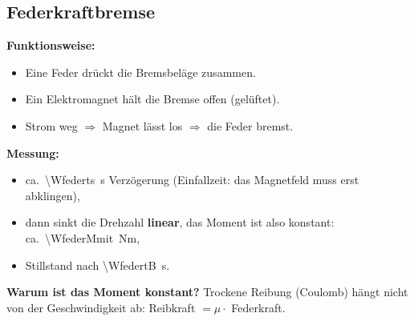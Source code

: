 \documentclass[11pt,a4paper]{article}
\begin{document}
\subsection{Federkraftbremse}
\textbf{Funktionsweise:}
\begin{itemize}
\item Eine Feder drückt die Bremsbeläge zusammen.
\item Ein Elektromagnet hält die Bremse offen (\glqq gelüftet\grqq).
\item Strom weg $\Rightarrow$ Magnet lässt los $\Rightarrow$ die Feder bremst.
\end{itemize}
\textbf{Messung:}
\begin{itemize}
\item ca.\ \SI{\Wfederts}{s} Verzögerung (Einfallzeit: das Magnetfeld muss erst abklingen),
\item dann sinkt die Drehzahl \textbf{linear}, das Moment ist also konstant: ca.\ \SI{\WfederMmit}{Nm},
\item Stillstand nach \SI{\WfedertB}{s}.
\end{itemize}
\textbf{Warum ist das Moment konstant?} Trockene Reibung (Coulomb) hängt nicht von der
Geschwindigkeit ab: Reibkraft $=\mu\cdot$ Federkraft.
\end{document}
